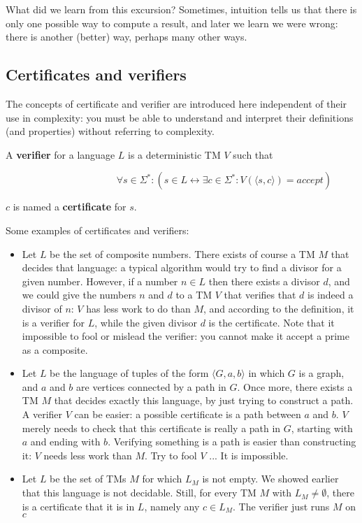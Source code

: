 What did we learn from this excursion? Sometimes, intuition tells us
that there is only one possible way to compute a result, and later we
learn we were wrong: there is another (better) way, perhaps many other
ways.

\subsection{Certificates and verifiers}

The concepts of certificate and verifier are introduced here
independent of their use in complexity: you must be able to understand
and interpret their definitions (and properties) without referring to
complexity.

\begin{definition} \label{verifiercertificate}
A {\bf verifier} for a language $L$ is a deterministic TM $V$
such that

~~~~~~~~~~~~~~~~~~~~~~
$\forall s \in \Sigma^* : (s \in L \leftrightarrow \exists c \in \Sigma^*: V(\langle s,c \rangle) = accept)$

$c$ is named a {\bf certificate} for $s$.
\end{definition}

\begin{example}
Some examples of certificates and verifiers:
\begin{itemize}
\item Let $L$ be the set of composite numbers. There exists of course a TM
$M$ that decides that language: a typical algorithm would try to find
a divisor for a given number. However, if a number $n \in L$ then
there exists a divisor $d$, and we could give the numbers $n$ and $d$
to a TM $V$ that verifies that $d$ is indeed a divisor of $n$: $V$
has less work to do than $M$, and according to the definition, it is a
verifier for $L$, while the given divisor $d$ is the certificate. Note
that it impossible to fool or mislead the verifier: you cannot make it
accept a prime as a composite.

\item
Let $L$ be the language of tuples of the form $\langle G,a,b \rangle$
in which $G$ is a graph, and $a$ and $b$ are vertices connected by a
path in $G$. Once more, there exists a TM $M$ that decides exactly
this language, by just trying to construct a path. A verifier $V$ can
be easier: a possible certificate is a path between $a$ and $b$. $V$
merely needs to check that this certificate is really a path in $G$,
starting with $a$ and ending with $b$. Verifying something is a path
is easier than constructing it: $V$ needs less work than $M$. Try to
fool $V$ ... It is impossible.

\item
Let $L$ be the set of TMs $M$ for which $L_M$ is not empty. We showed
earlier that this language is not decidable. Still, for every TM $M$
with $L_M \neq \emptyset$, there is a certificate that it is in $L$,
namely any $c \in L_M$. The verifier just runs $M$ on $c$

\end{itemize}
\end{example}

